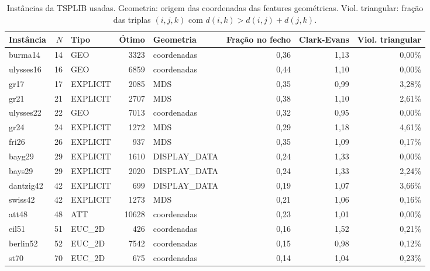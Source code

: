 \begin{table}[htb]
\centering
\caption{Instâncias da TSPLIB usadas. Geometria: origem das coordenadas das features geométricas. Viol. triangular: fração das triplas $(i,j,k)$ com $d(i,k)>d(i,j)+d(j,k)$.}
\label{tab:instancias}
\small
\begin{adjustbox}{max width=\linewidth}
\begin{tabular}{lrlrlrrr}
\toprule
Instância & $N$ & Tipo & Ótimo & Geometria & Fração no fecho & Clark-Evans & Viol. triangular \\
\midrule
burma14 & 14 & GEO & 3323 & coordenadas & 0{,}36 & 1{,}13 & 0{,}00\% \\
ulysses16 & 16 & GEO & 6859 & coordenadas & 0{,}44 & 1{,}10 & 0{,}00\% \\
gr17 & 17 & EXPLICIT & 2085 & MDS & 0{,}35 & 0{,}99 & 3{,}28\% \\
gr21 & 21 & EXPLICIT & 2707 & MDS & 0{,}38 & 1{,}10 & 2{,}61\% \\
ulysses22 & 22 & GEO & 7013 & coordenadas & 0{,}32 & 0{,}95 & 0{,}00\% \\
gr24 & 24 & EXPLICIT & 1272 & MDS & 0{,}29 & 1{,}18 & 4{,}61\% \\
fri26 & 26 & EXPLICIT & 937 & MDS & 0{,}35 & 1{,}09 & 0{,}17\% \\
bayg29 & 29 & EXPLICIT & 1610 & DISPLAY\_DATA & 0{,}24 & 1{,}33 & 0{,}00\% \\
bays29 & 29 & EXPLICIT & 2020 & DISPLAY\_DATA & 0{,}24 & 1{,}33 & 2{,}24\% \\
dantzig42 & 42 & EXPLICIT & 699 & DISPLAY\_DATA & 0{,}19 & 1{,}07 & 3{,}66\% \\
swiss42 & 42 & EXPLICIT & 1273 & MDS & 0{,}21 & 1{,}06 & 0{,}16\% \\
att48 & 48 & ATT & 10628 & coordenadas & 0{,}23 & 1{,}01 & 0{,}00\% \\
eil51 & 51 & EUC\_2D & 426 & coordenadas & 0{,}16 & 1{,}52 & 0{,}21\% \\
berlin52 & 52 & EUC\_2D & 7542 & coordenadas & 0{,}15 & 0{,}98 & 0{,}12\% \\
st70 & 70 & EUC\_2D & 675 & coordenadas & 0{,}14 & 1{,}04 & 0{,}23\% \\
\bottomrule
\end{tabular}
\end{adjustbox}
\end{table}
